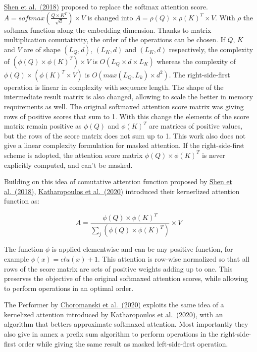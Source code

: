 \href{https://arxiv.org/abs/1812.01243}{Shen et al.~(2018)} proposed to
replace the softmax attention score.
\(A = softmax\left(\frac{Q \times K^T}{\sqrt{d}}\right) \times V\) is
changed into \(A = \rho(Q) \times \rho(K)^T \times V\). With \(\rho\)
the softmax function along the embedding dimension. Thanks to matrix
multiplication comutativity, the order of the operations can be chosen.
If \(Q\), \(K\) and \(V\) are of shape \((L_Q, d)\), \((L_K, d)\) and
\((L_K, d)\) respectively, the complexity of
\((\phi(Q) \times \phi(K)^T) \times V\) is
\(O(L_Q \times d \times L_K)\) whereas the complexity of
\(\phi(Q) \times (\phi(K)^T \times V)\) is
\(O\left(max(L_Q, L_k) \times d^2 \right)\). The right-side-first
operation is linear in complexity with sequence length. The shape of the
intermediate result matrix is also changed, allowing to scale the better
in memory requirements as well. The original softmaxed attention score
matrix was giving rows of positive scores that sum to 1. With this
change the elements of the score matrix remain positive as \(\phi(Q)\)
and \(\phi(K)^T\) are matrices of positive values, but the rows of the
score matrix does not sum up to 1. This work also does not give a linear
complexity formulation for masked attention. If the right-side-first
scheme is adopted, the attention score matrix
\(\phi(Q) \times \phi(K)^T\) is never explicitly computed, and can't be
masked.

Building on this idea of comutative attention function proposed by
\href{https://arxiv.org/abs/1812.01243}{Shen et al.~(2018)},
\href{https://arxiv.org/abs/2006.16236}{Katharopoulos et al.~(2020)}
introduced their kernerlized attention function as:

\[A = \frac{\phi(Q) \times \phi(K)^T}{\sum_j \left( \phi(Q) \times \phi(K)^T \right)} \times V\]

The function \(\phi\) is applied elementwise and can be any positive
function, for example \(\phi(x) = elu(x) + 1\). This attention is
row-wise normalized so that all rows of the score matrix are sets of
positive weights adding up to one. This preserves the objective of the
original softmaxed attention scores, while allowing to perform
operations in an optimal order.

The Performer by \href{https://arxiv.org/abs/2009.14794}{Choromanski et
al.~(2020)} exploits the same idea of a kernelized attention introduced
by \href{https://arxiv.org/abs/2006.16236}{Katharopoulos et al.~(2020)},
with an algorithm that betters approximate softmaxed attention. Most
importantly they also give in annex a prefix sum algorithm to perform
operations in the right-side-first order while giving the same result as
masked left-side-first operation.

